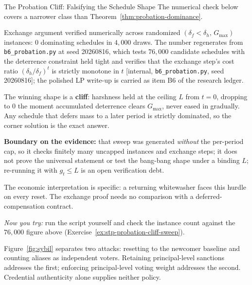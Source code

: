 \documentclass[11pt,a4paper]{article}
\theoremstyle{definition}
\begin{document}
\begin{pdexample}{The Probation Cliff: Falsifying the Schedule Shape}
\setlength{\parskip}{4pt plus 1pt}
The numerical check below covers a narrower class than
Theorem~\ref{thm:probation-dominance}.

Exchange
argument verified numerically across randomized
$(\delta_f<\delta_h,\,G_{\max})$ instances: $0$ dominating schedules in
$4{,}000$ draws. The number regenerates from \texttt{b6\_probation.py} at
seed 20260816, which tests $76{,}000$ candidate schedules with the deterrence
constraint held tight and verifies that the exchange step's cost ratio
$(\delta_h/\delta_f)^t$ is strictly monotone in $t$ [internal,
\texttt{b6\_probation.py}, seed 20260816]; the polished LP write-up is
carried as item B6 of the research ledger.

The winning shape is a
\textbf{cliff}: harshness held at the ceiling $L$ from $t=0$, dropping to $0$
the moment accumulated deterrence clears $G_{\max}$, never eased in gradually.
Any schedule that defers mass to a later period is strictly dominated, so the
corner solution is the exact answer.

\textbf{Boundary on the evidence:} that sweep was generated
\emph{without} the per-period cap, so it checks finitely many uncapped instances and
exchange steps; it does not prove the universal statement or test the bang-bang shape under a binding $L$; re-running it
with $g_t\le L$ is an open verification debt.

The economic interpretation is specific: a returning whitewasher faces this
hurdle on every reset. The exchange proof needs no comparison with a
deferred-compensation contract.

\emph{Now you try:} run the script yourself and check the instance count
against the $76{,}000$ figure above (Exercise~\ref{ex:stp-probation-cliff-sweep}).
\end{pdexample}

Figure~\ref{fig:sybil} separates two attacks: resetting to the newcomer baseline and counting aliases as independent voters. Retaining principal-level sanctions addresses the first; enforcing principal-level voting weight addresses the second. Credential authenticity alone supplies neither policy.


\end{document}
